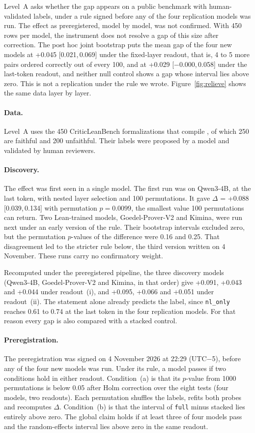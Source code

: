 \documentclass[10pt]{article}
\newcommand{\vr}[1]{\texttt{#1}}
\newcommand{\D}{\Delta}
\newcommand{\ic}[2]{[#1,\,#2]}
\begin{document}
Level~A asks whether the gap appears on a public benchmark with human-validated labels, under a rule signed before
any of the four replication models was run.
The effect as preregistered, model by model, was not confirmed. With 450 rows per model, the instrument does not
resolve a gap of this size after correction. The post hoc joint bootstrap puts the mean gap of the four new models
at +0.045 \ic{0.021}{0.069} under the fixed-layer readout, that is, 4 to 5 more pairs ordered correctly out of every
100, and at +0.029 \ic{−0.000}{0.058} under the last-token
readout, and neither null control shows a gap whose interval lies above zero. This is not a replication under the rule we wrote.
Figure~\ref{fig:relieve} shows the same data layer by layer.

\paragraph{Data.}
Level~A uses the 450 CriticLeanBench formalizations that compile \citep{criticlean}, of which 250 are faithful and
200 unfaithful. Their labels were proposed by a model and validated by human reviewers.

\paragraph{Discovery.}
The effect was first seen in a single model. The first run was on Qwen3-4B, at the last token, with nested layer
selection and 100 permutations. It gave
$\D$ = +0.088 \ic{0.039}{0.134} with permutation $p = 0.0099$, the smallest value 100 permutations can return. Two
Lean-trained models, Goedel-Prover-V2 and Kimina, were run next under an early version of the rule. Their bootstrap intervals
excluded zero, but the permutation $p$-values of the difference were 0.16 and 0.25. That disagreement led to the
stricter rule below, the third version written on 4 November. These runs carry no confirmatory weight.

Recomputed under the preregistered pipeline, the three discovery models (Qwen3-4B, Goedel-Prover-V2 and Kimina, in that order) give +0.091, +0.043 and +0.044 under
readout~(i), and +0.095, +0.066 and +0.051 under readout~(ii). The statement alone already predicts the label,
since \vr{nl\_only} reaches 0.61 to 0.74 at the last token in the four replication models. For that reason every gap is also compared
with a stacked control.

\paragraph{Preregistration.}
The preregistration was signed on 4 November 2026 at 22:29 (UTC$-$5), before any of the four new models was run.
Under its rule, a model passes if two conditions hold in either readout. Condition~(a) is that its $p$-value from
1000 permutations is below 0.05 after Holm correction \citep{holm} over the eight tests (four models, two
readouts). Each permutation shuffles the labels, refits both probes and recomputes $\D$. Condition~(b) is that the
interval of \vr{full} minus stacked lies entirely above zero. The global claim holds if at least three of four
models pass and the random-effects interval lies above zero in the same readout.
\end{document}
